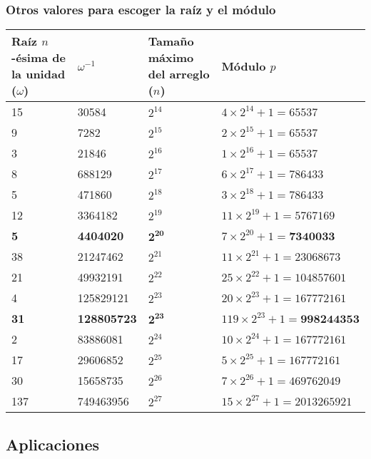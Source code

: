 \documentclass[11pt]{article}
\begin{document}
			\subsubsection{Otros valores para escoger la raíz y el módulo}
				\begin{table}[H]
					\centering
					\begin{tabular}{|p{2cm}|p{1.7cm}|p{2cm}|p{4.5cm}|}
						\hline
						Raíz $n$-ésima de la unidad ($\omega$) & $\omega^{-1}$ & Tamaño máximo del arreglo ($n$) & Módulo $p$ \\ \hline
						15 & 30584 & $2^{14}$ & $4 \times 2^{14} + 1 = 65537$ \\ \hline
						9 & 7282 & $2^{15}$ & $2 \times 2^{15} + 1 = 65537$ \\ \hline
						3 & 21846 & $2^{16}$ & $1 \times 2^{16} + 1 = 65537$ \\ \hline
						8 & 688129 & $2^{17}$ & $6 \times 2^{17} + 1 = 786433$ \\ \hline
						5 & 471860 & $2^{18}$ & $3 \times 2^{18} + 1 = 786433$ \\ \hline
						12 & 3364182 & $2^{19}$ & $11 \times 2^{19} + 1 = 5767169$ \\ \hline
						\textbf{5} & \textbf{4404020} & $\mathbf{2^{20}}$ & $7 \times 2^{20} + 1 = \textbf{7340033}$ \\ \hline
						38 & 21247462 & $2^{21}$ & $11 \times 2^{21} + 1 = 23068673$ \\ \hline
						21 & 49932191 & $2^{22}$ & $25 \times 2^{22} + 1 = 104857601$ \\ \hline
						4 & 125829121 & $2^{23}$ & $20 \times 2^{23} + 1 = 167772161$ \\ \hline
						\textbf{31} & \textbf{128805723} & $\mathbf{2^{23}}$ & $119 \times 2^{23} + 1 = \textbf{998244353}$ \\ \hline
						2 & 83886081 & $2^{24}$ & $10 \times 2^{24} + 1 = 167772161$ \\ \hline
						17 & 29606852 & $2^{25}$ & $5 \times 2^{25} + 1 = 167772161$ \\ \hline
						30 & 15658735 & $2^{26}$ & $7 \times 2^{26} + 1 = 469762049$ \\ \hline
						137 & 749463956 & $2^{27}$ & $15 \times 2^{27} + 1 = 2013265921$ \\ \hline
					\end{tabular}
				\end{table}
		
		\subsection{Aplicaciones}
\end{document}
